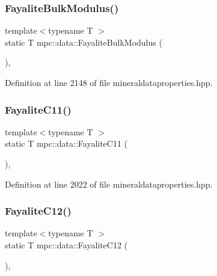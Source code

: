 \subsubsection{\texorpdfstring{Fayalite\+Bulk\+Modulus()}{FayaliteBulkModulus()}}
{\footnotesize\ttfamily template$<$typename T $>$ \\
static T mpc\+::data\+::\+Fayalite\+Bulk\+Modulus (\begin{DoxyParamCaption}{ }\end{DoxyParamCaption})\hspace{0.3cm}{\ttfamily [inline]}, {\ttfamily [static]}}



Definition at line 2148 of file mineraldataproperties.\+hpp.

\mbox{\label{namespacempc_1_1data_a414c1b1604e7e00eec6c5b26f2ac3a96}} 
\subsubsection{\texorpdfstring{Fayalite\+C11()}{FayaliteC11()}}
{\footnotesize\ttfamily template$<$typename T $>$ \\
static T mpc\+::data\+::\+Fayalite\+C11 (\begin{DoxyParamCaption}{ }\end{DoxyParamCaption})\hspace{0.3cm}{\ttfamily [inline]}, {\ttfamily [static]}}



Definition at line 2022 of file mineraldataproperties.\+hpp.

\mbox{\label{namespacempc_1_1data_abc336e16c100e36dd313b0f97ff65070}} 
\subsubsection{\texorpdfstring{Fayalite\+C12()}{FayaliteC12()}}
{\footnotesize\ttfamily template$<$typename T $>$ \\
static T mpc\+::data\+::\+Fayalite\+C12 (\begin{DoxyParamCaption}{ }\end{DoxyParamCaption})\hspace{0.3cm}{\ttfamily [inline]}, {\ttfamily [static]}}



